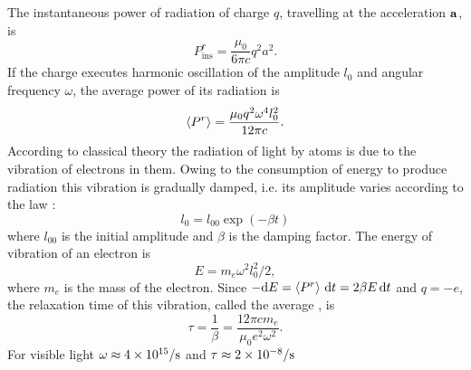 \subsection{}\label{31.3.4} The instantaneous power of radiation of charge $q$, travelling at the acceleration $\vb{a}$, is
\begin{equation*}%
P^{r}_{\text{ins}} = \frac{\mu_{0}}{6 \pi c} q^{2} a^{2}.
\end{equation*}
If the charge executes harmonic oscillation of the amplitude $l_{0}$ and angular frequency $\omega$, the average power of its radiation is
\begin{equation*}%
\expval{P^{r}} = \frac{\mu_{0}q^{2} \omega^{4} l_{0}^{2}}{12 \pi c}.
\end{equation*}
According to classical theory the radiation of light by atoms is due to the vibration of electrons in them. Owing to the consumption of energy to produce radiation this vibration is gradually damped, i.e. its amplitude varies according to the law
: 
\begin{equation*}%
l_{0} = l_{00} \exp (-\beta t)
\end{equation*}
where $l_{00}$ is the initial amplitude and $\beta$ is the damping factor. The energy of vibration of an electron  is
\begin{equation*}%
 E = m_{e}\omega^{2} l_{0}^{2} /2, 
\end{equation*}
where $m_{e}$ is the mass of the electron. Since $-\dd E = \expval{P^{r}} \, \dd t = 2\beta E \, \dd t$ and $q = -e$, the
relaxation time  of this vibration, called the average , is
\begin{equation*}%
\tau = \frac{1}{\beta} = \frac{12 \pi c m_{e}}{\mu_{0} e^{2} \omega^{2}}.
\end{equation*}
For visible light $\omega \approx \SI{4d15}{\per\second}$ and $\tau \approx \SI{2d-8}{\per\second}$

